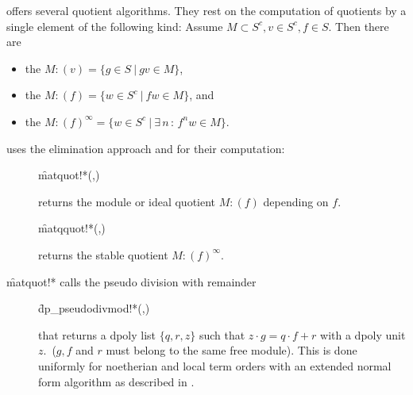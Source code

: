  offers several quotient algorithms. They rest on the computation
of quotients by a single element of the following kind: Assume
$M\subset S^c, v\in S^c, f\in S$. Then there are
\begin{itemize}
  \item[]
the  $M : (v) = \{g\in S\ |\ gv\in M\}$,
  \item[]
the  $M : (f) = \{w\in S^c\ |\ fw\in M\}$, and
  \item[]
the  $M : (f)^\infty = \{w\in S^c\ |\ \exists\,
n\, :\, f^nw\in M\}$.
\end{itemize}
 uses the elimination approach \cite[4.4.]{Cox:92} and
\cite[6.38]{Becker:93} for their computation:
\begin{description}

\item[]
  \begin{syntax}
    \f{matquot!*}(,)
  \end{syntax}
  \hypertarget{procedure:MATQUOT!*}{}
returns the module or ideal quotient $M:(f)$ depending on $f$.

\item[]
  \begin{syntax}
    \f{matqquot!*}(,)
  \end{syntax}
  \hypertarget{procedure:MATQQUOT!*}{}
returns the stable quotient $M:(f)^\infty$.
\end{description}
\f{matquot!*} calls the pseudo division with remainder
\begin{description}

\item[]
  \begin{syntax}
    \f{dp\_pseudodivmod!*}(,)
  \end{syntax}
  \hypertarget{procedure:DP_PSEUDODIVMOD!*}{}
that returns a dpoly list $\{q,r,z\}$ such that $z\cdot g =
q\cdot f + r$ with a dpoly unit $z$.\ ($g, f$ and $r$ must belong to
the same free module). This is done uniformly for noetherian and
local term orders with an extended normal form algorithm as described
in \cite{Graebe:95a}.
\end{description}

